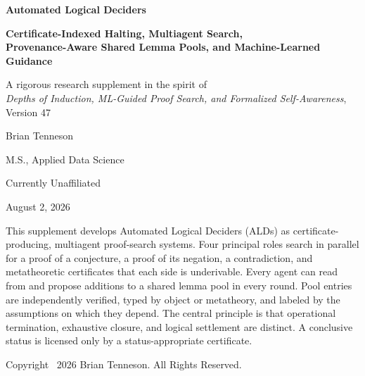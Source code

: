 \documentclass[11pt]{article}
\theoremstyle{definition}
\theoremstyle{remark}
\begin{document}
\hypersetup{pageanchor=false}
\begin{titlepage}
\thispagestyle{empty}
\centering
\vspace*{0.45in}
{\Huge\bfseries Automated Logical Deciders\par}
\vspace{0.18in}
{\LARGE\bfseries Certificate-Indexed Halting, Multiagent Search,\\
Provenance-Aware Shared Lemma Pools, and Machine-Learned Guidance\par}
\vspace{0.38in}
{\Large A rigorous research supplement in the spirit of\\
\emph{Depths of Induction, ML-Guided Proof Search, and Formalized Self-Awareness}, Version 47\par}
\vspace{0.55in}
{\Large Brian Tenneson\par}
\vspace{0.07in}
{\large M.S., Applied Data Science\par}
{\large Currently Unaffiliated\par}
\vfill
{\large August 2, 2026\par}
\vspace{0.28in}
\begin{minipage}{0.86\textwidth}
\small
This supplement develops Automated Logical Deciders (ALDs) as certificate-producing, multiagent proof-search systems. Four principal roles search in parallel for a proof of a conjecture, a proof of its negation, a contradiction, and metatheoretic certificates that each side is underivable. Every agent can read from and propose additions to a shared lemma pool in every round. Pool entries are independently verified, typed by object or metatheory, and labeled by the assumptions on which they depend. The central principle is that operational termination, exhaustive closure, and logical settlement are distinct. A conclusive status is licensed only by a status-appropriate certificate.
\end{minipage}
\vspace{0.34in}

{\small Copyright \textcopyright\ 2026 Brian Tenneson. All Rights Reserved.\par}
\end{titlepage}
\hypersetup{pageanchor=true}

\end{document}
